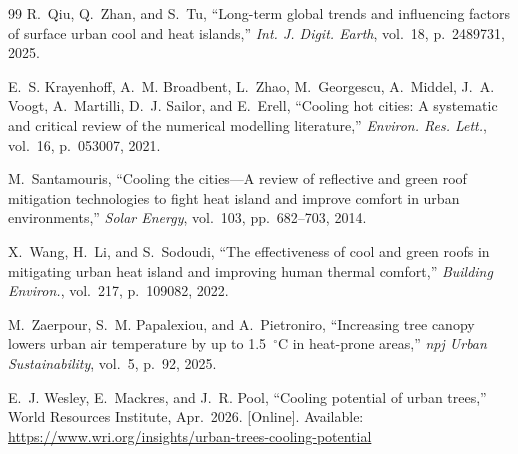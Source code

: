 \documentclass[journal]{IEEEtran}
\begin{document}
\begin{thebibliography}{99}
R.~Qiu, Q.~Zhan, and S.~Tu, ``Long-term global trends and influencing
factors of surface urban cool and heat islands,'' \emph{Int. J. Digit.
Earth}, vol.~18, p.~2489731, 2025.

E.~S. Krayenhoff, A.~M. Broadbent, L.~Zhao, M.~Georgescu, A.~Middel,
J.~A. Voogt, A.~Martilli, D.~J. Sailor, and E.~Erell, ``Cooling hot
cities: A systematic and critical review of the numerical modelling
literature,'' \emph{Environ. Res. Lett.}, vol.~16, p.~053007, 2021.

M.~Santamouris, ``Cooling the cities---A review of reflective and green
roof mitigation technologies to fight heat island and improve comfort in
urban environments,'' \emph{Solar Energy}, vol.~103, pp.~682--703, 2014.

X.~Wang, H.~Li, and S.~Sodoudi, ``The effectiveness of cool and green
roofs in mitigating urban heat island and improving human thermal
comfort,'' \emph{Building Environ.}, vol.~217, p.~109082, 2022.

M.~Zaerpour, S.~M. Papalexiou, and A.~Pietroniro, ``Increasing tree canopy
lowers urban air temperature by up to 1.5~$^{\circ}$C in heat-prone
areas,'' \emph{npj Urban Sustainability}, vol.~5, p.~92, 2025.

E.~J. Wesley, E.~Mackres, and J.~R. Pool, ``Cooling potential of urban
trees,'' World Resources Institute, Apr.~2026. [Online]. Available:
\url{https://www.wri.org/insights/urban-trees-cooling-potential}

\end{thebibliography}
\end{document}
